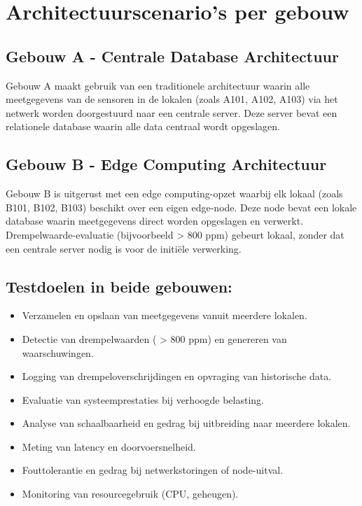 \section{Architectuurscenario's per gebouw}
\subsection{Gebouw A - Centrale Database Architectuur}

Gebouw A maakt gebruik van een traditionele architectuur waarin alle meetgegevens van de sensoren in de lokalen (zoals A101, A102, A103) via het netwerk worden doorgestuurd naar een centrale server. Deze server bevat een relationele database waarin alle data centraal wordt opgeslagen.

\subsection{Gebouw B - Edge Computing Architectuur}

Gebouw B is uitgerust met een edge computing-opzet waarbij elk lokaal (zoals B101, B102, B103) beschikt over een eigen edge-node. Deze node bevat een lokale database waarin meetgegevens direct worden opgeslagen en verwerkt. Drempelwaarde-evaluatie (bijvoorbeeld  > 800 ppm) gebeurt lokaal, zonder dat een centrale server nodig is voor de initiële verwerking.

\subsection{Testdoelen in beide gebouwen:}
\begin{itemize}
    \item Verzamelen en opslaan van meetgegevens vanuit meerdere lokalen.
    \item Detectie van drempelwaarden ( > 800 ppm) en genereren van waarschuwingen.
    \item Logging van drempeloverschrijdingen en opvraging van historische data.
    \item Evaluatie van systeemprestaties bij verhoogde belasting.
    \item Analyse van schaalbaarheid en gedrag bij uitbreiding naar meerdere lokalen.
    \item Meting van latency en doorvoersnelheid.
    \item Fouttolerantie en gedrag bij netwerkstoringen of node-uitval.
    \item Monitoring van resourcegebruik (CPU, geheugen).
\end{itemize}

